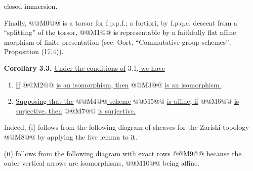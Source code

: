 closed immersion.

Finally, @@M0@@ is a torsor for f.p.p.f.; a fortiori, by f.p.q.c. descent from a ``splitting'' of the torsor, @@M1@@ is representable by a faithfully flat affine morphism of finite presentation (see: Oort, ``Commutative group schemes'', Proposition (17.4)).

\textbf{Corollary 3.3.} \uline{Under the conditions of} 3.1\uline{, we have}
\begin{enumerate}[label=\roman*)]
\item \uline{If} @@M2@@ \uline{is an isomorphism, then} @@M3@@ \uline{is an isomorphism.}
\item \uline{Supposing that the} @@M4@@\uline{-scheme} @@M5@@ \uline{is affine, if} @@M6@@ \uline{is surjective, then} @@M7@@ \uline{is surjective.}
\end{enumerate}

Indeed, (i) follows from the following diagram of sheaves for the Zariski topology
@@M8@@
by applying the five lemma to it.

(ii) follows from the following diagram with exact rows
@@M9@@
because the outer vertical arrows are isomorphisms, @@M10@@ being affine.

